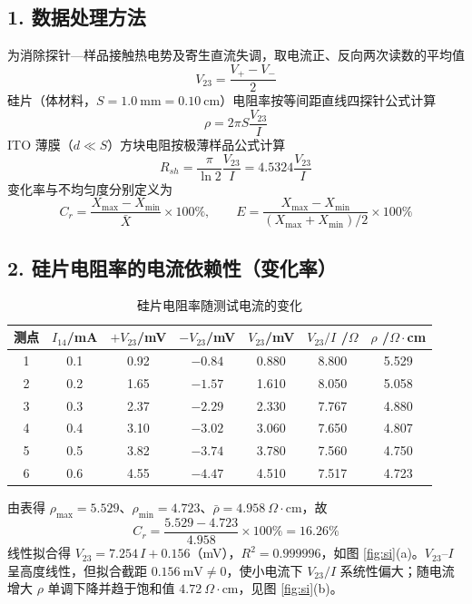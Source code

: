 \documentclass[12pt,a4paper]{ctexart}
\begin{document}
\subsection*{1. 数据处理方法}
为消除探针—样品接触热电势及寄生直流失调，取电流正、反向两次读数的平均值
\begin{equation}
V_{23}=\frac{V_{+}-V_{-}}{2}
\end{equation}
硅片（体材料，$S=1.0\ \mathrm{mm}=0.10\ \mathrm{cm}$）电阻率按等间距直线四探针公式计算
\begin{equation}
\rho=2\pi S\frac{V_{23}}{I}
\end{equation}
ITO 薄膜（$d\ll S$）方块电阻按极薄样品公式计算
\begin{equation}
R_{sh}=\frac{\pi}{\ln 2}\frac{V_{23}}{I}=4.5324\frac{V_{23}}{I}
\end{equation}
变化率与不均匀度分别定义为
\begin{equation}
C_r=\frac{X_{\max}-X_{\min}}{\bar X}\times 100\%,\qquad
E=\frac{X_{\max}-X_{\min}}{(X_{\max}+X_{\min})/2}\times 100\%
\end{equation}

\subsection*{2. 硅片电阻率的电流依赖性（变化率）}
\begin{table}[htbp]
\centering
\caption{硅片电阻率随测试电流的变化}
\begin{tabular}{ccccccc}
\hline
测点 & $I_{14}$/mA & $+V_{23}$/mV & $-V_{23}$/mV & $V_{23}$/mV & $V_{23}/I$ /$\Omega$ & $\rho$ /$\Omega\!\cdot\!$cm\\
\hline
1 & 0.1 & 0.92 & $-0.84$ & 0.880 & 8.800 & 5.529\\
2 & 0.2 & 1.65 & $-1.57$ & 1.610 & 8.050 & 5.058\\
3 & 0.3 & 2.37 & $-2.29$ & 2.330 & 7.767 & 4.880\\
4 & 0.4 & 3.10 & $-3.02$ & 3.060 & 7.650 & 4.807\\
5 & 0.5 & 3.82 & $-3.74$ & 3.780 & 7.560 & 4.750\\
6 & 0.6 & 4.55 & $-4.47$ & 4.510 & 7.517 & 4.723\\
\hline
\end{tabular}
\end{table}

由表得 $\rho_{\max}=5.529$、$\rho_{\min}=4.723$、$\bar\rho=4.958\ \Omega\!\cdot\!\mathrm{cm}$，故
\begin{equation}
C_r=\frac{5.529-4.723}{4.958}\times 100\%=16.26\%
\end{equation}
线性拟合得 $V_{23}=7.254\,I+0.156$（mV），$R^2=0.999996$，如图 \ref{fig:si}(a)。$V_{23}$–$I$ 呈高度线性，但拟合截距 $0.156\ \mathrm{mV}\neq 0$，使小电流下 $V_{23}/I$ 系统性偏大；随电流增大 $\rho$ 单调下降并趋于饱和值 $4.72\ \Omega\!\cdot\!\mathrm{cm}$，见图 \ref{fig:si}(b)。
\end{document}
